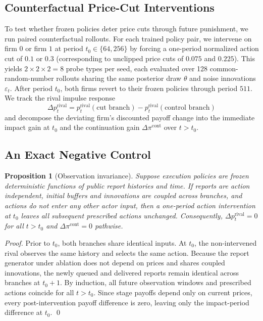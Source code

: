 \documentclass{article}
\newtheorem{proposition}{Proposition}
\begin{document}
\subsection{Counterfactual Price-Cut Interventions}

To test whether frozen policies deter price cuts through future punishment, we run paired counterfactual rollouts. For each trained policy pair, we intervene on firm $0$ or firm $1$ at period $t_0\in\{64,256\}$ by forcing a one-period normalized action cut of $0.1$ or $0.3$ (corresponding to unclipped price cuts of $0.075$ and $0.225$). This yields $2\times 2\times 2=8$ probe types per seed, each evaluated over 128 common-random-number rollouts sharing the same posterior draw $\theta$ and noise innovations $\varepsilon_t$. After period $t_0$, both firms revert to their frozen policies through period $511$. We track the rival impulse response
\[
\Delta p^{\mathrm{rival}}_t
= p^{\mathrm{rival}}_t(\text{cut branch})
- p^{\mathrm{rival}}_t(\text{control branch})
\]
and decompose the deviating firm's discounted payoff change into the immediate impact gain at $t_0$ and the continuation gain $\Delta\pi^{\mathrm{cont}}$ over $t>t_0$.

\subsection{An Exact Negative Control}

\begin{proposition}[Observation invariance]\label{prop:invariance}
Suppose execution policies are frozen deterministic functions of public report histories and time. If reports are action independent, initial buffers and innovations are coupled across branches, and actions do not enter any other actor input, then a one-period action intervention at $t_0$ leaves all subsequent prescribed actions unchanged. Consequently, $\Delta p^{\mathrm{rival}}_t = 0$ for all $t > t_0$ and $\Delta\pi^{\mathrm{cont}} = 0$ pathwise.
\end{proposition}

\begin{proof}
Prior to $t_0$, both branches share identical inputs. At $t_0$, the non-intervened rival observes the same history and selects the same action. Because the report generator under ablation does not depend on prices and shares coupled innovations, the newly queued and delivered reports remain identical across branches at $t_0+1$. By induction, all future observation windows and prescribed actions coincide for all $t>t_0$. Since stage payoffs depend only on current prices, every post-intervention payoff difference is zero, leaving only the impact-period difference at $t_0$. \qed
\end{proof}
\end{document}
